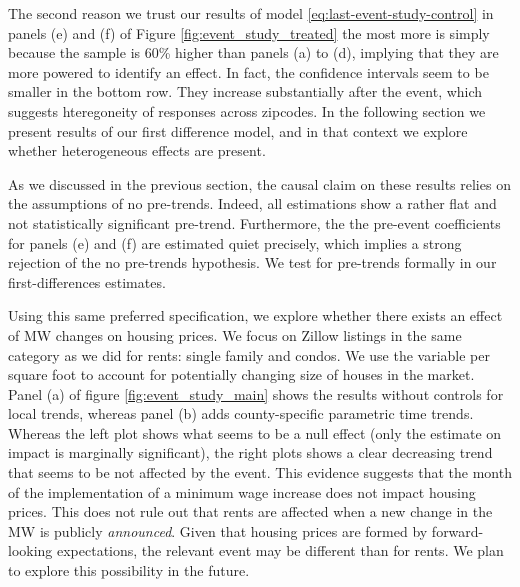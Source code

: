     The second reason we trust our results of model \eqref{eq:last-event-study-control} in panels (e) and (f) of Figure \ref{fig:event_study_treated} the most more is simply because the sample is 60\% higher than panels (a) to (d), implying that they are more powered to identify an effect. In fact, the confidence intervals seem to be smaller in the bottom row. They increase substantially after the event, which suggests hteregoneity of responses across zipcodes. In the following section we present results of our first difference model, and in that context we explore whether heterogeneous effects are present.
    
    As we discussed in the previous section, the causal claim on these results relies on the assumptions of no pre-trends. Indeed, all estimations show a rather flat and not statistically significant pre-trend. Furthermore, the the pre-event coefficients for panels (e) and (f) are estimated quiet precisely, which implies a strong rejection of the no pre-trends hypothesis. We test for pre-trends formally in our first-differences estimates.
    
    Using this same preferred specification, we explore whether there exists an effect of MW changes on housing prices. We focus on Zillow listings in the same category as we did for rents: single family and condos. We use the variable per square foot to account for potentially changing size of houses in the market. Panel (a) of figure \ref{fig:event_study_main} shows the results without controls for local trends, whereas panel (b) adds county-specific parametric time trends. Whereas the left plot shows what seems to be a null effect (only the estimate on impact is marginally significant), the right plots shows a clear decreasing trend that seems to be not affected by the event. This evidence suggests that the month of the implementation of a minimum wage increase does not impact housing prices. This does not rule out that rents are affected when a new change in the MW is publicly \textit{announced}. Given that housing prices are formed by forward-looking expectations, the relevant event may be different than for rents. We plan to explore this possibility in the future.
    

